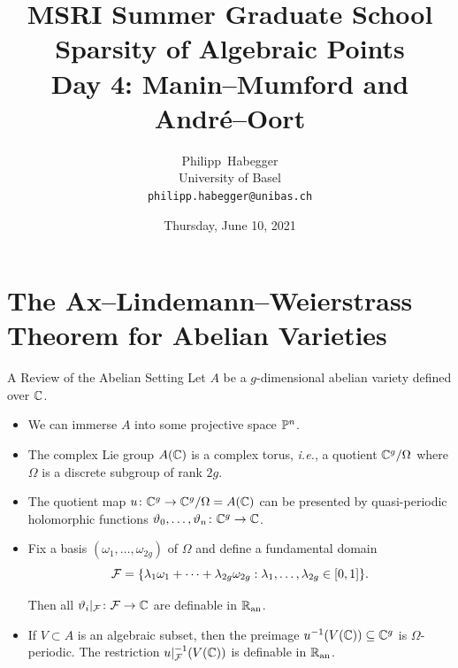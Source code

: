 \documentclass{beamer}
\title{MSRI Summer Graduate School \\ Sparsity of Algebraic Points \\
  Day 4: Manin--Mumford and Andr\'e--Oort}
\author{Philipp~Habegger \\ University of Basel \\ \texttt{philipp.habegger@unibas.ch}}
\date{Thursday, June 10, 2021}
\begin{document}
\setlength{\abovecaptionskip}{0pt} 
\setlength{\belowcaptionskip}{0pt} 

\renewcommand{\figurename}{Fig.}


\begin{frame}
  \titlepage
\end{frame}

\section{The Ax--Lindemann--Weierstrass Theorem for Abelian Varieties}


\begin{frame}{A Review of the Abelian Setting}
  Let $A$ be a $g$-dimensional abelian variety defined over ${\mathbb{C}}$.
  \begin{itemize}
  \item We can immerse $A$ into some projective space ${\mathbb{P}}^n$.

  \item The complex Lie group $A({\mathbb{C}})$ is a complex torus, \textit{i.e.}, a
    quotient ${\mathbb{C}}^g/\Omega$ where $\Omega$ is a discrete subgroup of
    rank $2g$.

  \item The quotient map $u\colon {\mathbb{C}}^g\rightarrow {\mathbb{C}}^g/\Omega
    =A({\mathbb{C}})$ can be presented by quasi-periodic holomorphic functions
    $\vartheta_0,\ldots,\vartheta_n \colon {\mathbb{C}}^g\rightarrow{\mathbb{C}}$.

  \item Fix a basis $(\omega_1,\ldots,\omega_{2g})$ of $\Omega$ and
    define a fundamental domain 
    $${\mathcal F} = \{\lambda_1\omega_1+\cdots+\lambda_{2g}\omega_{2g} :
    \lambda_1,\ldots,\lambda_{2g} \in [0,1]\}.$$

    Then all $\vartheta_i|_{{\mathcal F}}\colon {\mathcal F}\rightarrow{\mathbb{C}}$ are
    definable in ${{\mathbb{R}}_{\mathrm{an}}}$.

  \item If $V\subset A$ is an algebraic subset, then the preimage
    $u^{-1}(V({\mathbb{C}})) \subseteq{\mathbb{C}}^g$ is $\Omega$-periodic.
    The restriction $u|_{{\mathcal F}}^{-1}(V({\mathbb{C}}))$ is definable in ${{\mathbb{R}}_{\mathrm{an}}}$.
  \end{itemize}
\end{frame}
\end{document}
